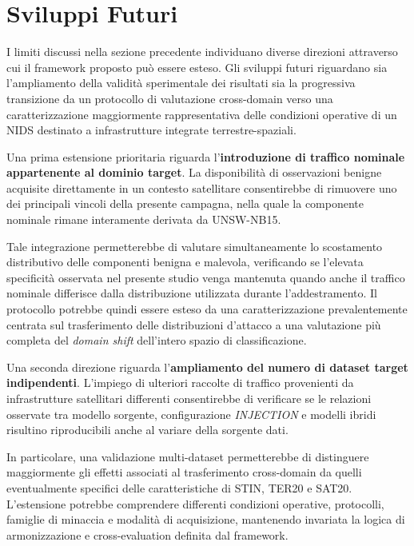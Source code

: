 
\section{Sviluppi Futuri}
\label{sec:sviluppi_futuri}

I limiti discussi nella sezione precedente individuano diverse direzioni attraverso cui il framework proposto può essere esteso.
Gli sviluppi futuri riguardano sia l'ampliamento della validità sperimentale dei risultati sia la progressiva transizione da un protocollo di valutazione cross-domain verso una caratterizzazione maggiormente rappresentativa delle condizioni operative di un NIDS destinato a infrastrutture integrate terrestre-spaziali.

Una prima estensione prioritaria riguarda l'\textbf{introduzione di traffico nominale appartenente al dominio target}.
La disponibilità di osservazioni benigne acquisite direttamente in un contesto satellitare consentirebbe di rimuovere uno dei principali vincoli della presente campagna, nella quale la componente nominale rimane interamente derivata da UNSW-NB15.

Tale integrazione permetterebbe di valutare simultaneamente lo scostamento distributivo delle componenti benigna e malevola, verificando se l'elevata specificità osservata nel presente studio venga mantenuta quando anche il traffico nominale differisce dalla distribuzione utilizzata durante l'addestramento.
Il protocollo potrebbe quindi essere esteso da una caratterizzazione prevalentemente centrata sul trasferimento delle distribuzioni d'attacco a una valutazione più completa del \textit{domain shift} dell'intero spazio di classificazione.

Una seconda direzione riguarda l'\textbf{ampliamento del numero di dataset target indipendenti}.
L'impiego di ulteriori raccolte di traffico provenienti da infrastrutture satellitari differenti consentirebbe di verificare se le relazioni osservate tra modello sorgente, configurazione \textit{INJECTION} e modelli ibridi risultino riproducibili anche al variare della sorgente dati.

In particolare, una validazione multi-dataset permetterebbe di distinguere maggiormente gli effetti associati al trasferimento cross-domain da quelli eventualmente specifici delle caratteristiche di STIN, TER20 e SAT20.
L'estensione potrebbe comprendere differenti condizioni operative, protocolli, famiglie di minaccia e modalità di acquisizione, mantenendo invariata la logica di armonizzazione e cross-evaluation definita dal framework.

